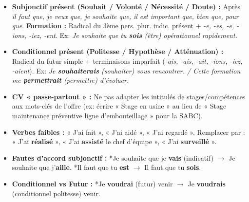 \documentclass[11pt]{article}
\begin{document}
\begin{aretenir}
\begin{itemize}
    \item \textbf{Subjonctif présent (Souhait / Volonté / Nécessité / Doute) :} Après \emph{il faut que, je veux que, je souhaite que, il est important que, bien que, pour que}. \textbf{Formation :} Radical du 3ème pers. plur. indic. présent + \emph{-e, -es, -e, -ions, -iez, -ent}. Ex: \emph{Je souhaite que tu \textbf{sois} (être) opérationnel rapidement.}
    \item \textbf{Conditionnel présent (Politesse / Hypothèse / Atténuation) :} Radical du futur simple + terminaisons imparfait (\emph{-ais, -ais, -ait, -ions, -iez, -aient}). Ex: \emph{Je \textbf{souhaiterais} (souhaiter) vous rencontrer. / Cette formation me \textbf{permettrait} (permettre) d'évoluer.}
\end{itemize}
\end{aretenir}

\begin{attention}
\begin{itemize}
    \item \textbf{CV « passe-partout » :} Ne pas adapter les intitulés de stages/compétences aux mots-clés de l'offre (ex: écrire « Stage en usine » au lieu de « Stage maintenance préventive ligne d'embouteillage » pour la SABC).
    \item \textbf{Verbes faibles :} « J'ai fait », « J'ai aidé », « J'ai regardé ». Remplacer par : « J'ai \textbf{réalisé} », « J'ai \textbf{assisté} le chef d'équipe », « J'ai \textbf{surveillé} ».
    \item \textbf{Fautes d'accord subjonctif :} *Je souhaite que je \textbf{vais} (indicatif) $\rightarrow$ Je souhaite que j'\textbf{aille}. *Il faut que tu \textbf{est} $\rightarrow$ Il faut que tu \textbf{sois}.
    \item \textbf{Conditionnel vs Futur :} *Je \textbf{voudrai} (futur) venir $\rightarrow$ Je \textbf{voudrais} (conditionnel politesse) venir.
\end{itemize}
\end{attention}
\end{document}
